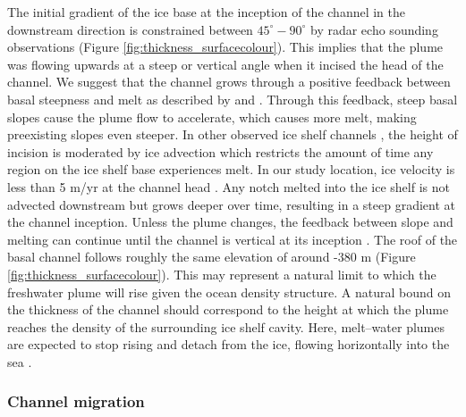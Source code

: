 The initial gradient of the ice base at the inception of the channel in the downstream direction is constrained between $45^{\circ}-90^{\circ}$ by radar echo sounding observations (Figure \ref{fig:thickness_surfacecolour}).  This implies that the plume was flowing upwards at a steep or vertical angle when it incised the head of the channel. We suggest that the channel grows through a positive feedback between basal steepness and melt as described by \cite{sergienko2013basal} and \cite{gladish2012ice}. Through this feedback, steep basal slopes cause the plume flow to accelerate, which causes more melt, making preexisting slopes even steeper. 
In other observed ice shelf channels \cite [e.g.][] {drews2017actively, jeofry2018hard}, the height of incision is moderated by ice advection which restricts the amount of time any region on the ice shelf base experiences melt. 
In our study location, ice velocity is less than 5 m/yr at the channel head \citep{rignot2017measures}. Any notch melted into the ice shelf is not advected downstream but grows deeper over time, resulting in a steep gradient at the channel inception. Unless the plume changes, the feedback between slope and melting can continue until the channel is vertical at its inception \citep{sergienko2013basal,gladish2012ice}. The roof of the basal channel follows roughly the same elevation of around -380 m (Figure \ref{fig:thickness_surfacecolour}). This may represent a natural limit to which the freshwater plume will rise given the ocean density structure. A natural bound on the thickness of the channel should correspond to the height at which the plume reaches the density of the surrounding ice shelf cavity. Here, melt--water plumes are expected to stop rising and detach from the ice, flowing horizontally into the sea \citep{jenkins2011convection, hewitt2020subglacial}.


\subsubsection{Channel migration} \label{sec:side_melt}

